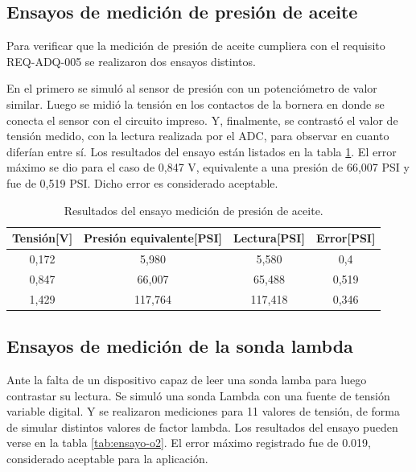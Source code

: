 \subsection{Ensayos de medición de presión de aceite}

Para verificar que la medición de presión de aceite cumpliera con el requisito REQ-ADQ-005 se realizaron dos ensayos distintos.

En el primero se simuló al sensor de presión con un potenciómetro de valor similar. Luego se midió la tensión en los contactos de la bornera en donde se conecta el sensor con el circuito impreso. Y, finalmente, se contrastó el valor de tensión medido, con la lectura realizada por el ADC, para observar en cuanto diferían entre sí. Los resultados del ensayo están listados en la tabla \ref{tab:ensayo-presion}. El error máximo se dio para el caso de 0,847 V, equivalente a una presión de 66,007 PSI y fue de 0,519 PSI. Dicho error es considerado aceptable. 

\begin{table}[htpb]
	\centering
	\caption{Resultados del ensayo medición de presión de aceite.}
	\centering
	\begin{tabular}{c c c c}    
		\toprule
		\textbf{Tensión[V]} & \textbf{Presión equivalente[PSI]} & \textbf{Lectura[PSI]} & \textbf{Error[PSI]}\\
		\midrule
		0,172		&   5,980 & 5,580 & 0,4 \\
		0,847		&   66,007 & 65,488 & 0,519 \\
		1,429		&   117,764 & 117,418 & 0,346 \\
		\bottomrule
	\end{tabular}
	\label{tab:ensayo-presion}
\end{table}

\subsection{Ensayos de medición de la sonda lambda}

Ante la falta de un dispositivo capaz de leer una sonda lamba para luego contrastar su lectura. Se simuló una sonda Lambda con una fuente de tensión variable digital. Y se realizaron mediciones para 11 valores de tensión, de forma de simular distintos valores de factor lambda. Los resultados del ensayo pueden verse en la tabla \ref{tab:ensayo-o2}. El error máximo registrado fue de 0.019, considerado aceptable para la aplicación.

